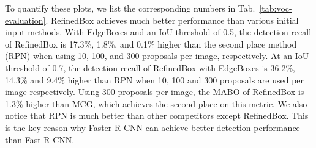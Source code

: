 \documentclass[letterpaper]{article} %
\newcommand{\tabref}[1]{Tab.~\ref{#1}}
\def\sArt{{state-of-the-art~}}
\begin{document}
To quantify these plots, we list the corresponding numbers
in \tabref{tab:voc-evaluation}.
RefinedBox achieves much better performance than various initial
input methods.
With EdgeBoxes and an IoU threshold of 0.5, the detection recall of RefinedBox
is 17.3\%, 1.8\%, and 0.1\% higher than the second place method (RPN) when
using 10, 100, and 300 proposals per image, respectively.
At an IoU threshold of 0.7, the detection recall of RefinedBox with EdgeBoxes
is 36.2\%, 14.3\% and 9.4\% higher than RPN when 10, 100 and 300 proposals
are used per image respectively.
Using 300 proposals per image, the MABO of RefinedBox is 1.3\% higher than
MCG, which achieves the second place on this metric.
We also notice that RPN is much better than other competitors except RefinedBox.
This is the key reason why Faster R-CNN can achieve better detection performance
than Fast R-CNN.
\end{document}
